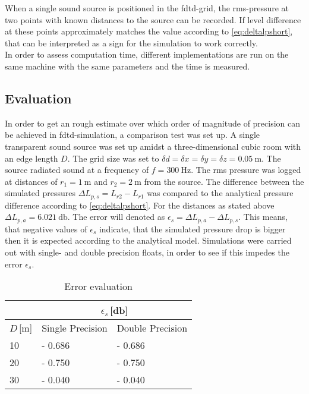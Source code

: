 When a single sound source is positioned in the \gls{fdtd}-grid, the \gls{rms}-pressure at two points with known distances to the source can be recorded. If level difference at these points approximately matches the value according to \autoref{eq:deltalpshort}, that can be interpreted as a sign for the simulation to work correctly.\\
In order to assess computation time, different implementations are run on the same machine with the same parameters and the time is measured. 
\subsection{Evaluation}\label{ssec:evaluation}
In order to get an rough estimate over which order of magnitude of precision can be achieved in \gls{fdtd}-simulation, a comparison test was set up. A single transparent sound source was set up amidst a three-dimensional cubic room with an edge length $D$. The grid size was set to $\delta d=\delta x=\delta y=\delta z = \SI{0.05}{\meter}$. The source radiated sound at a frequency of $f=\SI{300}{\hertz}$. The \gls{rms} pressure was logged at distances of $r_1=\SI{1}{\meter}$ and $r_2=\SI{2}{\meter}$ from the source. The difference between the simulated pressures $\Delta L_{p,s}=L_{r2}-L_{r1}$ was compared to the analytical pressure difference according to \autoref{eq:deltalpshort}. For the distances as stated above $\Delta L_{p,a}=\SI{6.021}{\decibel}$. The error will denoted as $\epsilon_{s}=\Delta L_{p,a} - \Delta L_{p,s}$. This means, that negative values of $\epsilon_{s}$ indicate, that the simulated pressure drop is bigger then it is expected according to the analytical model. Simulations were carried out with single- and double precision floats, in order to see if this impedes the error $\epsilon_s$.\\
\begin{table}[h]
\centering
\caption{Error evaluation}
\label{tab:pressure_difference}
\begin{tabular}{l|l|l}
      & \multicolumn{2}{c}{\(\epsilon_s\)\,[\si{\decibel}]} \\ \hline
\(D\)\,[\si{\meter}] & Single Precision & Double Precision \\ \hline
10    & - 0.686          & - 0.686          \\ \hline
20    & - 0.750          & - 0.750          \\ \hline
30    & - 0.040          & - 0.040         
\end{tabular}
\end{table} 

